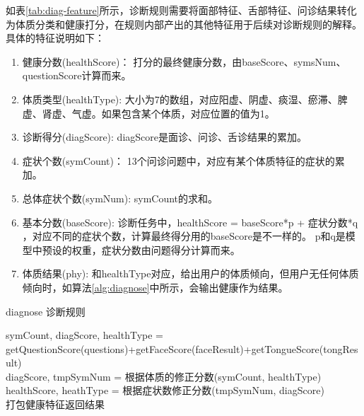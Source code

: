 如表\ref{tab:diag-feature}所示，诊断规则需要将面部特征、舌部特征、问诊结果转化为体质分类和健康打分，在规则内部产出的其他特征用于后续对诊断规则的解释。
具体的特征说明如下：
\begin{enumerate}
    \item 健康分数(healthScore)： 打分的最终健康分数，由baseScore、symsNum、questionScore计算而来。

    \item 体质类型(healthType): 大小为7的数组，对应阳虚、阴虚、痰湿、瘀滞、脾虚、肾虚、气虚。如果包含某个体质，对应位置的值为1。

    \item 诊断得分(diagScore): diagScore是面诊、问诊、舌诊结果的累加。

    \item 症状个数(symCount)： 13个问诊问题中，对应有某个体质特征的症状的累加。

    \item 总体症状个数(symNum): symCount的求和。

    \item 基本分数(baseScore): 诊断任务中，healthScore = baseScore*p + 症状分数*q ，对应不同的症状个数，计算最终得分用的baseScore是不一样的。
p和q是模型中预设的权重，症状分数由问题得分计算而来。

    \item 体质结果(phy): 和healthType对应，给出用户的体质倾向，但用户无任何体质倾向时，如算法\ref{alg:diagnose}中所示，会输出健康作为结果。
\end{enumerate}


\begin{algorithm}[htbp]
\caption{diagnose 诊断规则\cite{张红凯2018基于舌}}%
\label{alg:diagnose}
\LinesNumbered %
symCount, diagScore, healthType = getQuestionScore(questions)+getFaceScore(faceResult)+getTongueScore(tongResult)\\

diagScore, tmpSymNum = 根据体质的修正分数(symCount, healthType) \\
healthScore, heathType = 根据症状数修正分数(tmpSymNum, diagScore)\\

打包健康特征返回结果\\
\end{algorithm}

